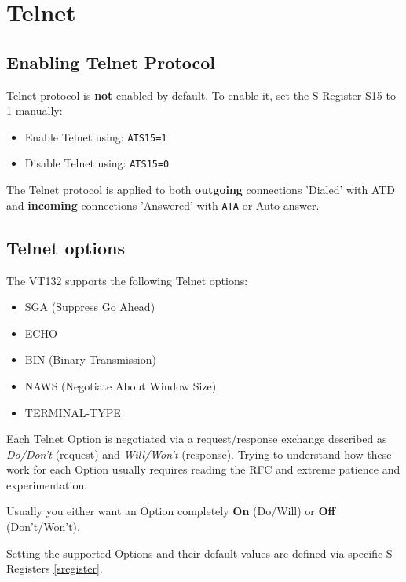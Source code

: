 
\newpage
\section{Telnet}

\subsection{Enabling Telnet Protocol}

Telnet protocol is \textbf{not} enabled by default. To enable it, set the S Register S15 to 1 manually:

\begin{itemize}[leftmargin=1em]
	\item Enable Telnet using: \texttt{ATS15=1}
	\item Disable Telnet using: \texttt{ATS15=0}
\end{itemize}

The Telnet protocol is applied to both \textbf{outgoing} connections 'Dialed' with ATD and \textbf{incoming} connections 'Answered' with \texttt{ATA} or Auto-answer.

\subsection{Telnet options}

The VT132 supports the following Telnet options:

\begin{itemize}[leftmargin=1em]
	\item SGA (Suppress Go Ahead)
	\item ECHO
	\item BIN (Binary Transmission)
	\item NAWS (Negotiate About Window Size)
	\item TERMINAL-TYPE
\end{itemize}

Each Telnet Option is negotiated via a request/response exchange described as \textit{Do/Don't} (request) and \textit{Will/Won't} (response).
Trying to understand how these work for each Option usually requires reading the RFC and extreme patience and experimentation.

Usually you either want an Option completely \textbf{On} (Do/Will) or \textbf{Off} (Don't/Won't).

Setting the supported Options and their default values are defined via specific S Registers \vref{sregister}.

